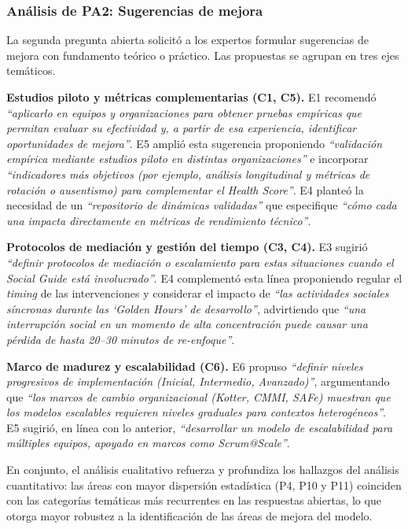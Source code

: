 \subsubsection{Análisis de PA2: Sugerencias de mejora}

La segunda pregunta abierta solicitó a los expertos formular sugerencias de mejora con fundamento teórico o práctico. Las propuestas se agrupan en tres ejes temáticos.

\textbf{Estudios piloto y métricas complementarias (C1, C5).} E1 recomendó \textit{``aplicarlo en equipos y organizaciones para obtener pruebas empíricas que permitan evaluar su efectividad y, a partir de esa experiencia, identificar oportunidades de mejora''}. E5 amplió esta sugerencia proponiendo \textit{``validación empírica mediante estudios piloto en distintas organizaciones''} e incorporar \textit{``indicadores más objetivos (por ejemplo, análisis longitudinal y métricas de rotación o ausentismo) para complementar el Health Score''}. E4 planteó la necesidad de un \textit{``repositorio de dinámicas validadas''} que especifique \textit{``cómo cada una impacta directamente en métricas de rendimiento técnico''}.

\textbf{Protocolos de mediación y gestión del tiempo (C3, C4).} E3 sugirió \textit{``definir protocolos de mediación o escalamiento para estas situaciones cuando el Social Guide está involucrado''}. E4 complementó esta línea proponiendo regular el \textit{timing} de las intervenciones y considerar el impacto de \textit{``las actividades sociales síncronas durante las `Golden Hours' de desarrollo''}, advirtiendo que \textit{``una interrupción social en un momento de alta concentración puede causar una pérdida de hasta 20--30 minutos de re-enfoque''}.

\textbf{Marco de madurez y escalabilidad (C6).} E6 propuso \textit{``definir niveles progresivos de implementación (Inicial, Intermedio, Avanzado)''}, argumentando que \textit{``los marcos de cambio organizacional (Kotter, CMMI, SAFe) muestran que los modelos escalables requieren niveles graduales para contextos heterogéneos''}. E5 sugirió, en línea con lo anterior, \textit{``desarrollar un modelo de escalabilidad para múltiples equipos, apoyado en marcos como Scrum@Scale''}.

En conjunto, el análisis cualitativo refuerza y profundiza los hallazgos del análisis cuantitativo: las áreas con mayor dispersión estadística (P4, P10 y P11) coinciden con las categorías temáticas más recurrentes en las respuestas abiertas, lo que otorga mayor robustez a la identificación de las áreas de mejora del modelo.

